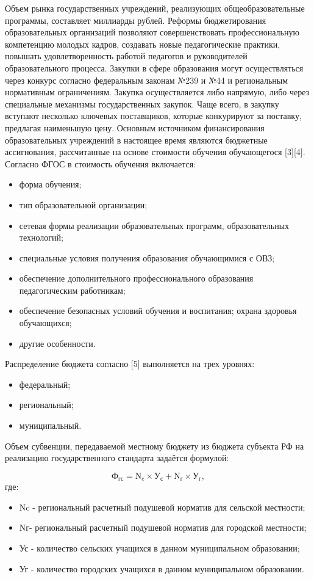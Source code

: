 Объем рынка государственных учреждений, реализующих общеобразовательные программы, составляет миллиарды рублей. Реформы бюджетирования образовательных организаций позволяют совершенствовать профессиональную компетенцию молодых кадров, создавать новые педагогические практики, повышать удовлетворенность работой педагогов и руководителей образовательного процесса.  
Закупки в сфере образования могут осуществляться через конкурс согласно федеральным законам №239 и №44 и региональным нормативным ограничениям. Закупка осуществляется либо напрямую, либо через специальные механизмы государственных закупок. Чаще всего, в закупку вступают несколько ключевых поставщиков, которые конкурируют за поставку, предлагая наименьшую цену. 
Основным источником финансирования образовательных учреждений в настоящее время являются бюджетные ассигнования, рассчитанные на основе стоимости обучения обучающегося [3][4]. Согласно ФГОС в стоимость обучения включается:
\begin{itemize}
    \item форма обучения;
    \item тип образовательной организации;
    \item сетевая формы реализации образовательных программ, образовательных технологий;
    \item специальные условия получения образования обучающимися с ОВЗ;
    \item  обеспечение дополнительного профессионального образования педагогическим работникам;
    \item обеспечение безопасных условий обучения и воспитания;
охрана здоровья обучающихся;
    \item другие особенности.
\end{itemize}

Распределение бюджета согласно [5] выполняется на трех уровнях:

\begin{itemize}
    \item федеральный;
    \item региональный; 
    \item муниципальный.
\end{itemize}

Объем субвенции, передаваемой местному бюджету из бюджета субъекта РФ на реализацию государственного стандарта задаётся формулой:

$$
    \text{Ф}_\text{гс} = \text{N}_\text{c} \times \text{У}_\text{с} + \text{N}_\text{г} \times \text{У}_\text{г},
$$
где:
\begin{itemize}
    \item Nc - региональный расчетный подушевой норматив для сельской местности;
    \item Nг- региональный расчетный подушевой норматив для городской местности;
    \item Ус - количество сельских учащихся в данном муниципальном образовании;
    \item Уг - количество городских учащихся в данном муниципальном образовании.
\end{itemize}
             
